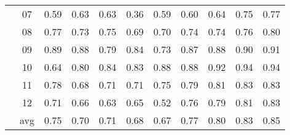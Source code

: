 \documentclass[runningheads]{llncs}
\begin{document}
\begin{table}[h!]
\begin{center}
\begin{tabular}{ccccccccccc}
		& 07 &\cellcolor{blue!20}0.59 &\cellcolor{blue!50}0.63  &\cellcolor{blue!50}0.63  &\cellcolor{blue!10}0.36  &\cellcolor{blue!20}0.59   &\cellcolor{blue!30}0.60  &\cellcolor{blue!60}0.64   &\cellcolor{blue!70}0.75 &\cellcolor{blue!80}\color{white}0.77 \\
		
		& 08 &\cellcolor{blue!70}0.77  &\cellcolor{blue!30}0.73  &\cellcolor{blue!50}0.75  &\cellcolor{blue!10}0.69  &\cellcolor{blue!20}0.70   &\cellcolor{blue!40}0.74  &\cellcolor{blue!40}0.74   &\cellcolor{blue!60}0.76 &\cellcolor{blue!80}\color{white}0.80 \\
		
		& 09 &\cellcolor{blue!60}0.89 &\cellcolor{blue!50}0.88  &\cellcolor{blue!20}0.79  &\cellcolor{blue!30}0.84  &\cellcolor{blue!10}0.73   &\cellcolor{blue!40}0.87   &\cellcolor{blue!50}0.88   &\cellcolor{blue!70}0.90 &\cellcolor{blue!80}\color{white}0.91 \\
		
		& 10  &\cellcolor{blue!10}0.64  &\cellcolor{blue!20}0.80  &\cellcolor{blue!40}0.84  &\cellcolor{blue!30}0.83  &\cellcolor{blue!50}0.88   &\cellcolor{blue!50}0.88   &\cellcolor{blue!60}0.92   &\cellcolor{blue!80}\color{white}0.94 &\cellcolor{blue!80}\color{white}0.94 \\
		
		& 11 &\cellcolor{blue!40}0.78 &\cellcolor{blue!10}0.68  &\cellcolor{blue!20}0.71  &\cellcolor{blue!20}0.71  &\cellcolor{blue!30}0.75   &\cellcolor{blue!50}0.79   &\cellcolor{blue!60}0.81   &\cellcolor{blue!80}\color{white}0.83 &\cellcolor{blue!80}\color{white}0.83 \\
		
		& 12  &\cellcolor{blue!40}0.71  &\cellcolor{blue!30}0.66  &\cellcolor{blue!10}0.63  &\cellcolor{blue!20}0.65  &\cellcolor{blue!5}0.52   &\cellcolor{blue!50}0.76   &\cellcolor{blue!60}0.79   &\cellcolor{blue!70}0.81 &\cellcolor{blue!80}\color{white}0.83 \\
\midrule
& avg &\cellcolor{blue!40}0.75 &\cellcolor{blue!20}0.70  &\cellcolor{blue!30}0.71  &\cellcolor{blue!10}0.68 &\cellcolor{blue!5}0.67 &\cellcolor{blue!50}0.77 &\cellcolor{blue!60}0.80 &\cellcolor{blue!70}0.83 &\cellcolor{blue!80}\color{white}0.85\\
\bottomrule
\end{tabular}
\end{center}
\end{table}
\end{document}
